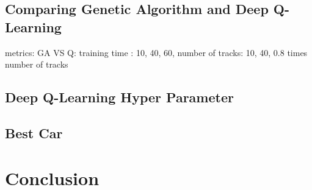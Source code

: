 \documentclass[11pt,a4paper]{article}
\begin{document}
		\subsection*{Comparing Genetic Algorithm and Deep Q-Learning }
metrics: GA VS Q: training time : 10, 40, 60, number of tracks: 10, 40, 0.8 times number of tracks

		
		\subsection*{Deep Q-Learning Hyper Parameter}
		
		\subsection*{Best Car}

	



    \section*{Conclusion}
	
\end{document}
